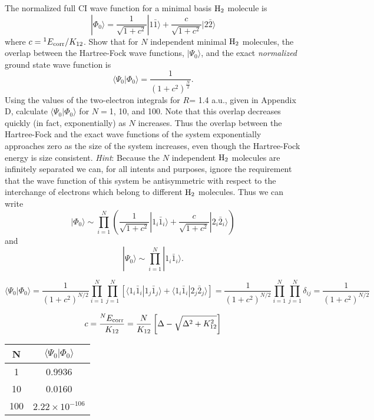 \documentclass[a4paper]{book}
\newcommand{\corr}{{\rm corr}}
\begin{document}
	\begin{exercise}
	The normalized full CI wave function for a minimal basis $\ce{H2}$ molecule is
	\[
		| \Phi_0 \rangle = \frac{1}{ \sqrt{1+c^2} } | 1 \bar{1} \rangle + \frac{c}{ \sqrt{1+c^2} } | 2 \bar{2} \rangle
	\]
	where $c = {}^{1}E_{\rm corr}/K_{12}$. Show that for $N$ independent minimal $\ce{H2}$ molecules, the overlap between the Hartree-Fock wave functions, $| \Psi_0 \rangle$, and the exact {\it normalized} ground state wave function is
	\[
		\langle \Psi_0 | \Phi_0 \rangle = \frac{1}{ (1+c^2)^{\frac{N}{2}} }.
	\]
	Using the values of the two-electron integrals for $R$= 1.4 a.u., given in Appendix D, calculate $\langle \Psi_0 | \Phi_0 \rangle$ for $N=$1, 10, and 100. Note that this overlap decreases quickly (in fact, exponentially) as $N$ increases. Thus the overlap between the Hartree-Fock and the exact wave functions of the system exponentially approaches zero as the size of the system increases, even though the Hartree-Fock energy is size consistent. {\it Hint}: Because the $N$ independent $\ce{H2}$ molecules are infinitely separated we can, for all intents and purposes, ignore the requirement that the wave function of this system be antisymmetric with respect to the interchange of electrons which belong to different $\ce{H2}$ molecules. Thus we can write
	\[
		| \Phi_0 \rangle \sim \prod_{i=1}^N \left( \frac{1}{ \sqrt{ 1 + c^2 } } | 1_i \bar{1}_i \rangle + \frac{c}{ \sqrt{ 1 + c^2 } } | 2_i \bar{2}_i \rangle \right)
	\]
	and
	\[
		| \Psi_0 \rangle \sim \prod_{i=1}^N | 1_i \bar{1}_i \rangle.
	\]
	\end{exercise}
	
	\begin{solution}
	
	\begin{equation}
		\langle \Psi_0 | \Phi_0 \rangle = \frac{1}{(1+c^2)^{N/2}} \prod_{ i=1 }^N \prod_{ j=1 }^N \left[ \langle 1_i \bar{1}_i | 1_j \bar{1}_j \rangle + \langle 1_i \bar{1}_i | 2_j \bar{2}_j \rangle \right] = \frac{1}{(1+c^2)^{N/2}} \prod_{ i=1 }^N \prod_{ j=1 }^N \delta_{ij} = \frac{1}{(1+c^2)^{N/2}}
	\end{equation}
	
	\[
		c = \frac{ ^N E_\corr }{ K_{12} } = \frac{ N }{ K_{12} } \left[ \Delta - \sqrt{ \Delta^2 + K^2_{12} } \right]
	\]

	\begin{minipage}{\textwidth}
    \centering
    \captionsetup{type=table}
    \begin{tabular}{c|c} \hline
		N & $\langle \Psi_0 | \Phi_0 \rangle$ \\ \hline
		1 & 0.9936 \\
		10 & 0.0160 \\
		100 & $2.22\times10^{-106}$ \\ \hline
	\end{tabular}
	\end{minipage}

	\end{solution}
	
\end{document}
